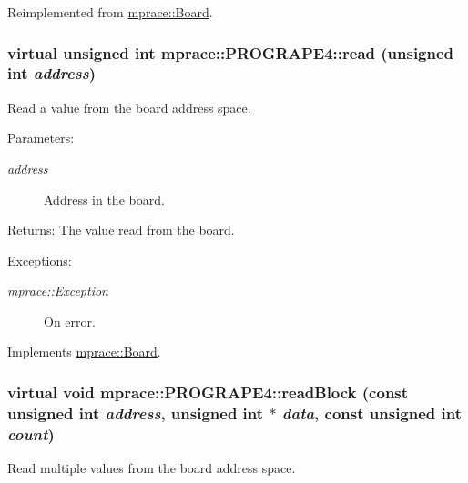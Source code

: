 Reimplemented from \hyperlink{classmprace_1_1Board_e0}{mprace::Board}.\hypertarget{classmprace_1_1PROGRAPE4_a3}{
\subsubsection[read]{\setlength{\rightskip}{0pt plus 5cm}virtual unsigned int mprace::PROGRAPE4::read (unsigned int {\em address})}}
\label{classmprace_1_1PROGRAPE4_a3}


Read a value from the board address space. 

\begin{Desc}
\item[Parameters:]
\begin{description}
\item[{\em address}]Address in the board. \end{description}
\end{Desc}
\begin{Desc}
\item[Returns:]The value read from the board. \end{Desc}
\begin{Desc}
\item[Exceptions:]
\begin{description}
\item[{\em mprace::Exception}]On error.\end{description}
\end{Desc}


Implements \hyperlink{classmprace_1_1Board_a4}{mprace::Board}.\hypertarget{classmprace_1_1PROGRAPE4_a5}{
\subsubsection[readBlock]{\setlength{\rightskip}{0pt plus 5cm}virtual void mprace::PROGRAPE4::read\-Block (const unsigned int {\em address}, unsigned int $\ast$ {\em data}, const unsigned int {\em count})}}
\label{classmprace_1_1PROGRAPE4_a5}


Read multiple values from the board address space. 

